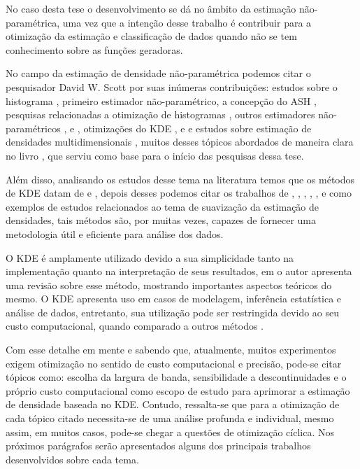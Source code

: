 No caso desta tese o desenvolvimento se dá no âmbito da estimação não-paramétrica, uma vez que a intenção desse trabalho é contribuir para a otimização da estimação e classificação de dados quando não se tem conhecimento sobre as funções geradoras.


No campo da estimação de densidade não-paramétrica podemos citar o pesquisador David W. Scott por suas inúmeras contribuições: estudos sobre o histograma \cite{histogramScott}, primeiro estimador não-paramétrico, a concepção do \ac{ASH} \cite{ashScott}, pesquisas relacionadas a otimização de histogramas \cite{scott1979optimal}, outros estimadores não-paramétricos \cite{scott1987biased}, \cite{scott1981monte} e \cite{wang19941}, otimizações do \ac{KDE} \cite{terrell1992variable}, \cite{scott1977kernel} e \cite{scott1985kernel} e estudos sobre estimação de densidades multidimensionais \cite{sain1994cross}, muitos desses tópicos abordados de maneira clara no livro \cite{scott2015multivariate}, que serviu como base para o início das pesquisas dessa tese.

Além disso, analisando os estudos desse tema na literatura temos que os métodos de \ac{KDE} datam de \cite{rosenblatt1956remarks} e \cite{parzen1962estimation}, depois desses podemos citar os trabalhos de  \cite{eubank1988spline}, \cite{hardle1990applied}, \cite{hardle1988smoothing}, \cite{silverman1986density}, \cite{wahba1990spline}, \cite{wand1994kernel} e \cite{jones1996brief} como exemplos de estudos relacionados ao tema de suavização da estimação de densidades, tais métodos são, por muitas vezes, capazes de fornecer uma metodologia útil e eficiente para análise dos dados.

O \ac{KDE} é amplamente utilizado devido a sua simplicidade tanto na implementação quanto na interpretação de seus resultados, em \cite{zambom2012review} o autor apresenta uma revisão sobre esse método, mostrando importantes aspectos teóricos do mesmo. O \ac{KDE} apresenta uso em casos de modelagem, inferência estatística e análise de dados, entretanto, sua utilização pode ser restringida devido ao seu custo computacional, quando comparado a outros métodos \cite{tang2016fast}. 

Com esse detalhe em mente e sabendo que, atualmente, muitos experimentos exigem otimização no sentido de custo computacional e precisão, pode-se citar tópicos como: escolha da largura de banda, sensibilidade a descontinuidades e o próprio custo computacional como escopo de estudo para aprimorar a estimação de densidade baseada no \ac{KDE}. Contudo, ressalta-se que para a otimização de cada tópico citado necessita-se de uma análise profunda e individual, mesmo assim, em muitos casos, pode-se chegar a questões de otimização cíclica. Nos próximos parágrafos serão apresentados alguns dos principais trabalhos desenvolvidos sobre cada tema.


